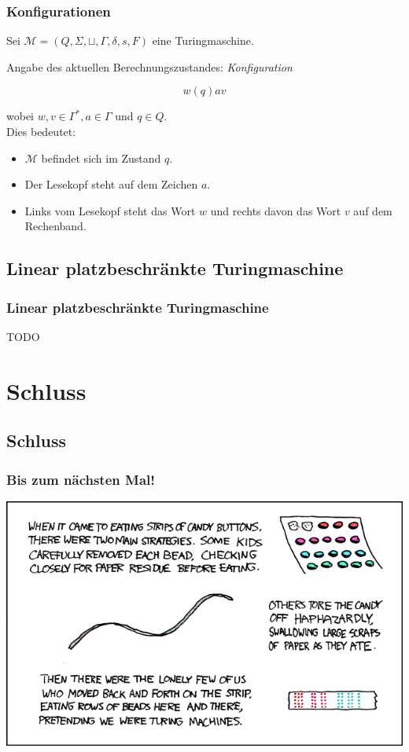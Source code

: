 \begin{frame}
\frametitle{Konfigurationen}
Sei $\mathcal{M} =(Q,\Sigma, \sqcup, \Gamma,\delta,s,F)$ eine Turingmaschine.

Angabe des aktuellen Berechnungszustandes: \emph{Konfiguration}

$$w(q)av$$ 

wobei $w,v \in \Gamma^*, a \in \Gamma$ und $q\in Q$. \\

Dies bedeutet:

\begin{itemize}
	\item $\mathcal{M}$ befindet sich im Zustand $q$.
	\item Der Lesekopf steht auf dem Zeichen $a$.
	\item Links vom Lesekopf steht das Wort $w$ und rechts davon das Wort $v$ auf dem Rechenband.
\end{itemize}
\end{frame}

\subsection{Linear platzbeschränkte Turingmaschine}
\begin{frame}
	\frametitle{Linear platzbeschränkte Turingmaschine}
	TODO
\end{frame}

\section{Schluss}
\subsection{Schluss}

\begin{frame}
\frametitle{Bis zum nächsten Mal!}
\begin{center}
  \includegraphics[width=1 \textheight]{images/xkcd_205.png}
\end{center}
\end{frame}

